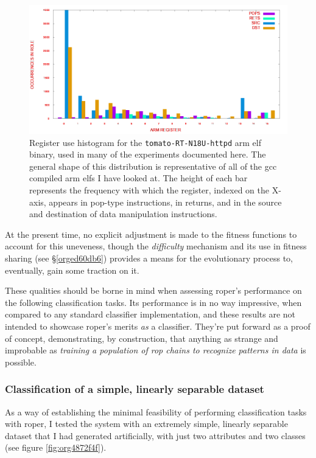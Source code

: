 \documentclass[12pt,glossary]{dalthesis}
\begin{document}
\begin{figure}[htbp]
\centering
\includegraphics[width=.9\linewidth]{../images/plots/tomato-register-histogram.png}
\caption{\label{fig:org50732f5}
Register use histogram for the \texttt{tomato-RT-N18U-httpd} \gls{arm} \gls{elf} binary, used in many of the experiments documented here. The general shape of this distribution is representative of all of the \gls{gcc} compiled \gls{arm} \glspl{elf} I have looked at. The height of each bar represents the frequency with which the register, indexed on the X-axis, appears in pop-type instructions, in returns, and in the source and destination of data manipulation instructions.}
\end{figure}

At the present time, no explicit adjustment is made to the fitness functions
to account for this uneveness, though the \emph{difficulty} mechanism and its use in
fitness sharing (see \S \ref{orged60db6}) provides a means for the evolutionary
process to, eventually, gain some traction on it.

These qualities should be borne in mind when assessing \gls{roper}'s performance
on the following classification tasks. Its performance is in no way impressive,
when compared to any standard classifier implementation, and these results are
not intended to showcase \gls{roper}'s merits \emph{as} a classifier. They're put
forward as a proof of concept, demonstrating, by construction, that anything as
strange and improbable as \emph{training a population of \gls{rop} chains to recognize
patterns in data} is possible.

\subsubsection{Classification of a simple, linearly separable dataset}
\label{sec:org6474746}
\label{org61b7745}

As a way of establishing the minimal feasibility of performing classification
tasks with \gls{roper}, I tested the system with an extremely simple, linearly
separable dataset that I had generated artificially, with just two attributes
and two classes (see figure \ref{fig:org4872f4f}).
\end{document}
